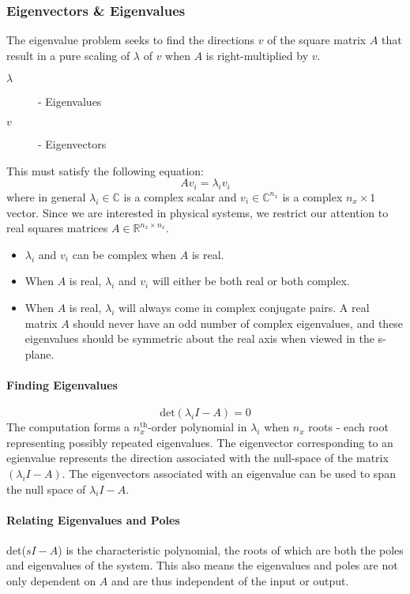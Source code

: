 \documentclass[../notes.tex]{subfiles}
\begin{document}
\subsubsection{Eigenvectors \& Eigenvalues} \label{sec:eig}
The eigenvalue problem seeks to find the directions $v$ of the square matrix $A$ that result in a pure scaling of $\lambda$ of $v$ when $A$ is right-multiplied by $v$.
\begin{description}
    \item[$\lambda$] - Eigenvalues
    \item[$v$] - Eigenvectors  
\end{description}
This must satisfy the following equation:
\begin{equation}
    Av_i = \lambda_i v_i
\end{equation}
where in general $\lambda_i \in \mathbb{C}$ is a complex scalar and $v_i \in \mathbb{C}^{n_x}$ is a complex $n_x \times 1$ vector. Since we are interested in physical systems, we restrict our attention to real squares matrices $A\in \mathbb{R}^{n_x \times n_x}$.
\begin{itemize}
    \item $\lambda_i$ and $v_i$ can be complex when $A$ is real.
    \item When $A$ is real, $\lambda_i$ and $v_i$ will either be both real or both complex.
    \item When $A$ is real, $\lambda_i$ will always come in complex conjugate pairs. A real matrix $A$ should never have an odd number of complex eigenvalues, and these eigenvalues should be symmetric about the real axis when viewed in the s-plane.
\end{itemize}
\paragraph{Finding Eigenvalues}
\begin{equation*}
    \text{det}(\lambda_i I - A) = 0
\end{equation*}
The computation forms a $n_x^{\text{th}}$-order polynomial in $\lambda_i$ when $n_x$ roots - each root representing possibly repeated eigenvalues. The eigenvector corresponding to an egienvalue represents the direction associated with the null-space of the matrix $(\lambda_i I -A)$. The eigenvectors associated with an eigenvalue can be used to span the null space of $\lambda_i I - A$.

\paragraph{Relating Eigenvalues and Poles}
det($s I - A$) is the characteristic polynomial, the roots of which are both the poles and eigenvalues of the system. This also means the eigenvalues and poles are not only dependent on $A$ and are thus independent of the input or output.
\end{document}
